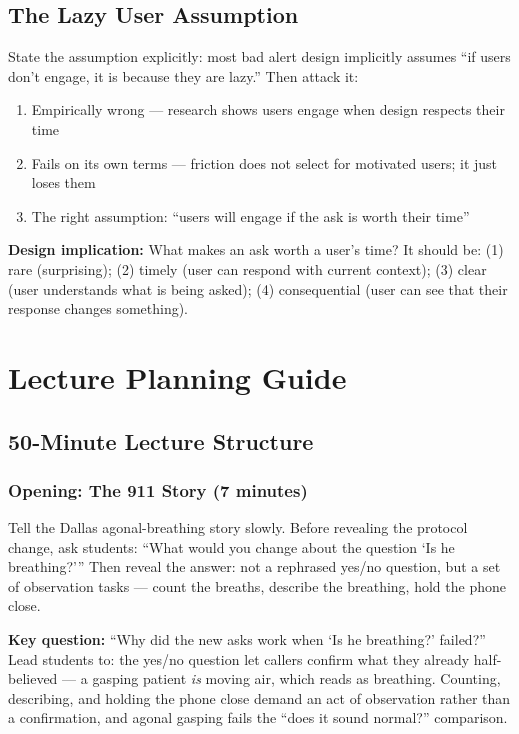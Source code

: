 \subsection{The Lazy User Assumption}

State the assumption explicitly: most bad alert design implicitly assumes ``if users don't engage, it is because they are lazy.'' Then attack it:
\begin{enumerate}
    \item Empirically wrong --- research shows users engage when design respects their time
    \item Fails on its own terms --- friction does not select for motivated users; it just loses them
    \item The right assumption: ``users will engage if the ask is worth their time''
\end{enumerate}

\textbf{Design implication:} What makes an ask worth a user's time? It should be: (1) rare (surprising); (2) timely (user can respond with current context); (3) clear (user understands what is being asked); (4) consequential (user can see that their response changes something).

\section{Lecture Planning Guide}

\subsection{50-Minute Lecture Structure}

\subsubsection{Opening: The 911 Story (7 minutes)}

Tell the Dallas agonal-breathing story slowly. Before revealing the protocol change, ask students: ``What would you change about the question `Is he breathing?''' Then reveal the answer: not a rephrased yes/no question, but a set of observation tasks --- count the breaths, describe the breathing, hold the phone close.

\begin{trythis}
\textbf{Key question:} ``Why did the new asks work when `Is he breathing?' failed?'' Lead students to: the yes/no question let callers confirm what they already half-believed --- a gasping patient \emph{is} moving air, which reads as breathing. Counting, describing, and holding the phone close demand an act of observation rather than a confirmation, and agonal gasping fails the ``does it sound normal?'' comparison.
\end{trythis}

